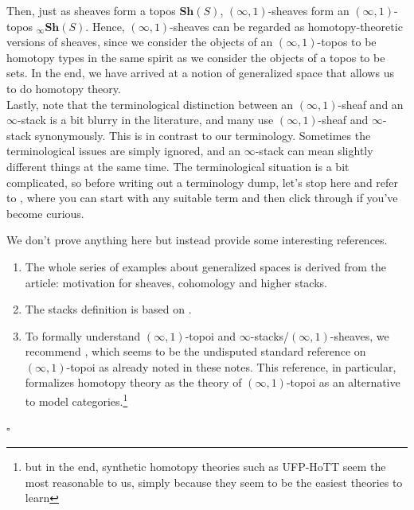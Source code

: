 \begin{exa}
Then, just as sheaves form a topos $\mathbf{Sh}(S)$, $(\infty,1)$-sheaves form an $(\infty,1)$-topos ${}_{\infty}\mathbf{Sh}(S)$.
Hence, $(\infty,1)$-sheaves can be regarded as homotopy-theoretic versions of sheaves, since we consider the objects of an $(\infty,1)$-topos to be homotopy types in the same spirit as we consider the objects of a topos to be sets.
In the end, we have arrived at a notion of generalized space that allows us to do homotopy theory.
\\
Lastly, note that the terminological distinction between an $(\infty,1)$-sheaf and an $\infty$-stack is a bit blurry in the literature, and many use $(\infty,1)$-sheaf and $\infty$-stack synonymously.
This is in contrast to our terminology.
Sometimes the terminological issues are simply ignored, and an $\infty$-stack can mean slightly different things at the same time.
The terminological situation is a bit complicated, so before writing out a terminology dump, let's stop here and refer to \cite{wiki-nlab0000}, where you can start with any suitable term and then click through if you've become curious.
\end{exa}
\begin{prf}
We don't prove anything here but instead provide some interesting references.
\begin{enumerate}
\item[$\bullet$]
The whole series of examples about generalized spaces is derived from the \cite{wiki-nlab0000} article: motivation for sheaves, cohomology and higher stacks.
\item[$\bullet$]
The stacks definition is based on \cite{c82f5e22}.
\item[$\bullet$]
To formally understand $(\infty,1)$-topoi and $\infty$-stacks/$(\infty,1)$-sheaves, we recommend \cite{0349e8ea}, which seems to be the undisputed standard reference on $(\infty,1)$-topoi as already noted in these notes.
This reference, in particular, formalizes homotopy theory as the theory of $(\infty,1)$-topoi as an alternative to model categories.\footnote{but in the end, synthetic homotopy theories such as UFP-HoTT seem the most reasonable to us, simply because they seem to be the easiest theories to learn}
\end{enumerate}
\phantom{proven}
\hfill
$\square$
\end{prf}
